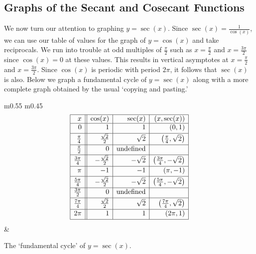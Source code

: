 \subsection{Graphs of the Secant and Cosecant Functions}
\label{secantcosecantgraphsection}

We now turn our attention to graphing $y = \sec(x)$.  Since $\sec(x) = \frac{1}{\cos(x)}$, we can use our table of values for the graph of $y = \cos(x)$ and take reciprocals. We run into trouble at odd multiples of $\frac{\pi}{2}$ such as $x = \frac{\pi}{2}$ and $x = \frac{3\pi}{2}$ since $\cos(x) = 0$ at these values.  This results in vertical asymptotes at $x = \frac{\pi}{2}$ and $x = \frac{3\pi}{2}$.  Since $\cos(x)$ is periodic with period $2\pi$, it follows that $\sec(x)$ is also.  Below we graph a fundamental cycle of $y = \sec(x)$  along with a more complete graph obtained by the usual `copying and pasting.' 


\medskip

\noindent\hskip-10pt\begin{minipage}{\textwidth}
\begin{center}
\begin{tabular}{ m{} m{}}
\setlength{\extrarowheight}{2pt}
\[ \begin{array}{|r||r|r|r|}  

\hline

 x & \cos(x) & \sec(x) & (x,\sec(x)) \\ \hline
0  & 1 & 1 & (0,1) \\ [2pt]   \hline
\frac{\pi}{4}  & \frac{\sqrt{2}}{2} & \sqrt{2} & \left(\frac{\pi}{4}, \sqrt{2} \right) \\ [2pt] \hline 
\frac{\pi}{2}  & 0 & \text{undefined} &  \\ [2pt] \hline 
\frac{3\pi}{4}  & -\frac{\sqrt{2}}{2} & -\sqrt{2} & \left(\frac{3\pi}{4}, -\sqrt{2} \right) \\ [2pt] \hline 
\pi & -1 & -1 &  (\pi, -1) \\ [2pt] \hline 
\frac{5\pi}{4}  & -\frac{\sqrt{2}}{2} & -\sqrt{2} & \left(\frac{5\pi}{4}, -\sqrt{2} \right) \\ [2pt] \hline 
\frac{3\pi}{2}  & 0 & \text{undefined} & \\ [2pt] \hline 
\frac{7\pi}{4}  & \frac{\sqrt{2}}{2} & \sqrt{2} & \left(\frac{7\pi}{4}, \sqrt{2} \right) \\ [2pt] \hline 
2\pi  & 1 &  1& (2\pi, 1) \\  [2pt] \hline
\end{array} \] \setlength{\extrarowheight}{0pt} &
\end{tabular}
\end{center}
\captionsetup{type=figure}
\caption{The `fundamental cycle' of $y = \sec(x)$.}\label{fig:secgraph1}
\end{minipage}


